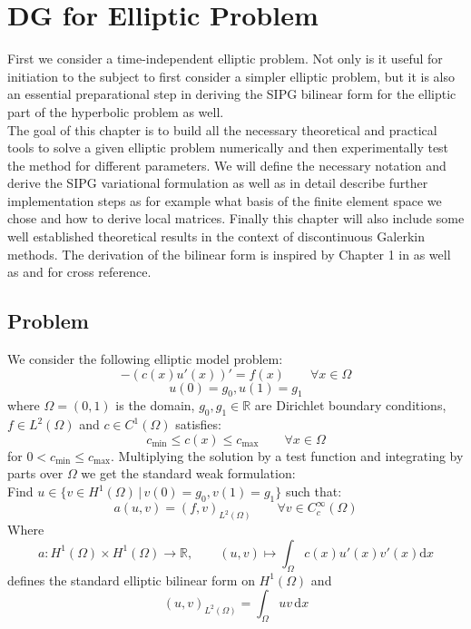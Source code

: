 \chapter{DG for Elliptic Problem}

First we consider a time-independent elliptic problem. Not only is it
useful for initiation to the subject to first consider a simpler elliptic problem, but it
is also an essential preparational step in deriving the SIPG bilinear form for the
elliptic part of the hyperbolic problem as well.
\\
The goal of this chapter is to build all the necessary theoretical and practical
tools to solve a given elliptic problem
numerically and then experimentally test the method for different parameters.
We will define the necessary notation and derive
the SIPG variational formulation as well as in detail describe further implementation steps as
for example what basis of the finite element space we chose and how to derive local matrices.
Finally this chapter will also include some well established theoretical results in
the context of discontinuous Galerkin methods.
The derivation
of the bilinear form is inspired by
Chapter 1 in \cite{riviere2008} as well as \cite{georgoulis2011Springer} and \cite{grote2006}
for cross reference.

\section{Problem}
\label{sec:elliptic_problem}
We consider the following elliptic model problem:
\begin{equation}
	\label{eq:elliptic_pde}
	-(c(x)u'(x))' = f(x) \qquad \forall x\in \Omega
\end{equation}
\begin{equation}
	\label{eq:elliptic_pde_bc}
	u(0) = g_0, u(1) = g_1
\end{equation}
where $\Omega = (0,1)$ is the domain, $g_0, g_1 \in \mathbb{R}$ are
Dirichlet boundary conditions, $f \in L^2(\Omega)$ and $c \in C^1(\Omega)$
satisfies:
\[
	c_{\min} \leq c(x) \leq c_{\max} \qquad \forall x\in \Omega
\]
for $0 < c_{\min} \leq c_{\max}$.
Multiplying the solution by a test function and integrating by parts over $\Omega$ we get the
standard weak formulation: \\
Find $u \in \{v \in H^1(\Omega)\, | \,  v(0) = g_0, v(1) = g_1\} $ such that:
\begin{equation}
	\label{eq:elliptic_weak_form}
	a(u,v) = (f,v)_{L^2(\Omega)} \qquad \forall v \in C_c^{\infty}(\Omega)
\end{equation}
Where
\[
	a:H^1(\Omega) \times H^1(\Omega) \to \mathbb{R}, \qquad (u,v) \mapsto \int_{\Omega} c(x)u'(x)v'(x) \text{d}x
\]
defines the standard elliptic bilinear form on $H^1(\Omega)$ and
\[
	(u,v)_{L^2(\Omega)} = \int_{\Omega} uv \,\text{d}x
\]

